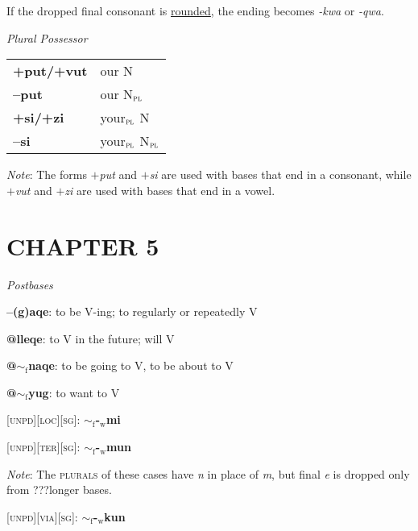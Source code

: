 \documentclass{article}
\begin{document}
If the dropped final consonant is \underline{rounded}, the ending becomes \textit{-kwa} or \textit{-qwa}.

\bigskip

\textit{Plural Possessor} \\
\begin{tabular}{ l l }
\textbf{+put/+vut} & our N \\
\textbf{--put} & our N$_\text{\textsc{pl}}$ \\
\textbf{+si/+zi} & your$_\text{\textsc{pl}}$ N \\
\textbf{--si} & your$_\text{\textsc{pl}}$ N$_\text{\textsc{pl}}$ \\
\end{tabular}

\textit{Note}: The forms \textit{$+$put} and \textit{$+$si} are used with bases that end in a consonant, while \textit{$+$vut} and \textit{$+$zi} are used with bases that end in a vowel.

\section*{CHAPTER 5}

\textit{Postbases}
\begin{description}
\item \textbf{--(g)aqe}: to be V-ing; to regularly or repeatedly V
\item \textbf{@lleqe}: to V in the future; will V
\item \textbf{@$\sim_\text{f}$naqe}: to be going to V, to be about to V
\item \textbf{@$\sim_\text{f}$yug}: to want to V
\end{description}

\bigskip

\textsc{[unpd][loc][sg]}: \textbf{$\sim_\text{f}$-$_\text{w}$mi}

\textsc{[unpd][ter][sg]}: \textbf{$\sim_\text{f}$-$_\text{w}$mun}

\textit{Note}: The \textsc{plurals} of these cases have \textit{n} in place of \textit{m}, but final \textit{e} is dropped only from ???longer bases.

\bigskip

\textsc{[unpd][via][sg]}: \textbf{$\sim_\text{f}$-$_\text{w}$kun}
\end{document}

